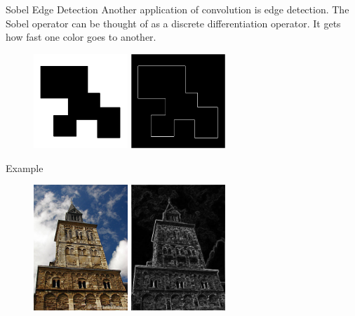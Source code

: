 \documentclass{beamer}
\begin{document}
\begin{frame}{Sobel Edge Detection}
Another application of convolution is edge detection. The Sobel operator can be thought of as a discrete differentiation operator. It gets how fast one color goes to another. 

\begin{figure}[ht]
\includegraphics[width=1.4in]{edgein.png}
\hspace{.1in}
\includegraphics[width=1.4in]{edgeout.jpg}
\hspace{.1in}
\end{figure}
\end{frame}

\begin{frame}{Example}
\begin{figure}[ht]
\includegraphics[width=1.4in]{churchin.jpg}
\hspace{.1in}
\includegraphics[width=1.4in]{churchout.jpg}
\hspace{.1in}
\end{figure}
\end {frame}
\end{document}
